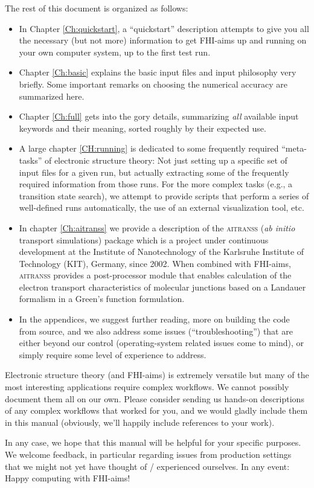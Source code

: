 The rest of this document is organized as follows:
\begin{itemize}
  \item In Chapter \ref{Ch:quickstart}, a ``quickstart'' 
    description attempts to give you all the necessary
    (but not more) information to get FHI-aims up and running on your own
    computer system, up to the first test run.
  \item Chapter \ref{Ch:basic} explains the basic input files and input
    philosophy very briefly. Some important remarks on choosing the numerical
    accuracy are summarized here.
  \item Chapter \ref{Ch:full} gets into the gory details, summarizing
    \emph{all} available input keywords and their meaning, sorted roughly by
    their expected use. 
  \item A large chapter \ref{CH:running} is dedicated to some frequently required
    ``meta-tasks'' of electronic structure theory: Not just setting up a
    specific set of input files for a given run, but actually extracting some
    of the frequently required information from those runs. For the more
    complex tasks (e.g., a transition state search), we attempt to provide
    scripts that perform a series of well-defined runs automatically, the 
    use of an external visualization tool, etc.  
  \item In chapter \ref{Ch:aitranss} we provide a description of the 
    \textsc{aitranss} ({\it ab initio} transport simulations) package which is
    a project under continuous development at the Institute of Nanotechnology  
    of the Karlsruhe Institute of Technology (KIT), Germany, since 2002. 
    When combined with FHI-aims, \textsc{aitranss} provides a
    post-processor module that enables calculation of the electron
    transport characteristics of molecular junctions based on a Landauer  
    formalism in a Green's function formulation.
  \item In the appendices, we suggest further reading, more on building
    the code from source, and we also address
    some issues (``troubleshooting'') that are either beyond
    our control (operating-system related issues come to mind), or simply
    require some level of experience to address.  
\end{itemize}
    Electronic structure
    theory (and FHI-aims) is extremely versatile but many of the most
    interesting applications require complex workflows. We cannot
    possibly document them all on our own. Please consider sending us
    hands-on descriptions of any complex workflows that worked for
    you, and we would gladly include them in this manual (obviously,
    we'll happily include references to your work).

In any case, we hope that this manual will be helpful for your specific
purposes. We welcome feedback, in particular regarding issues from
production settings that we might not yet have thought of / experienced
ourselves. In any event: Happy computing with FHI-aims! 


